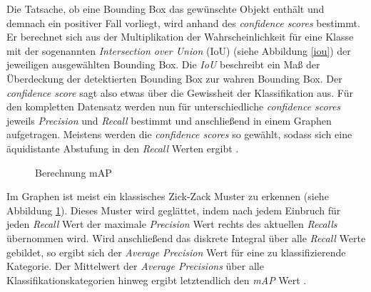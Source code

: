 Die Tatsache, ob eine Bounding Box das gewünschte Objekt enthält und demnach ein positiver Fall vorliegt, wird anhand des \textit{confidence scores} bestimmt. Er berechnet sich aus der Multiplikation der Wahrscheinlichkeit für eine Klasse mit der sogenannten \textit{Intersection over Union} (IoU) (siehe Abbildung \ref{iou}) der jeweiligen ausgewählten Bounding Box. Die \textit{IoU} beschreibt ein Maß der Überdeckung der detektierten Bounding Box zur wahren Bounding Box. Der \textit{confidence score} sagt also etwas über die Gewissheit der Klassifikation aus. Für den kompletten Datensatz werden nun für unterschiedliche \textit{confidence scores} jeweils \textit{Precision} und \textit{Recall} bestimmt und anschließend in einem Graphen aufgetragen. Meistens werden die \textit{confidence scores} so gewählt, sodass sich eine äquidistante Abstufung in den \textit{Recall} Werten ergibt \cite{DingfuZhouJinFangXibinSongChenyeGuanJunboYinYuchaoDaiRuigangYang.2019}. 

\begin{figure}[ht]
	\caption[Berechnung mAP]{Berechnung mAP \cite{JonathanHui.20180307}} 
	\label{map}
\end{figure} 

Im Graphen ist meist ein klassisches \glqq Zick-Zack\grqq{} Muster zu erkennen (siehe Abbildung \ref{map}). Dieses Muster wird geglättet, indem nach jedem Einbruch für jeden \textit{Recall} Wert der maximale \textit{Precision} Wert rechts des aktuellen \textit{Recalls} übernommen wird. Wird anschließend das diskrete Integral über alle \textit{Recall} Werte gebildet, so ergibt sich der \textit{Average Precision} Wert für eine zu klassifizierende Kategorie. Der Mittelwert der  \textit{Average Precisions} über alle Klassifikationskategorien hinweg ergibt letztendlich den \textit{mAP} Wert \cite{JonathanHui.20180307}. 

